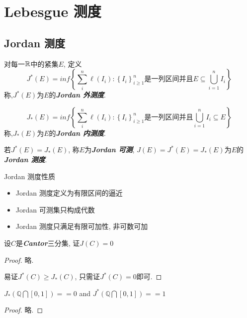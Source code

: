 \documentclass[12pt, a4paper, oneside, UTF8]{ctexbook}  %
\begin{document}
\else
\fi

\chapter{Lebesgue 测度}
\section{Jordan 测度}

\begin{defn}
    对每一$\mathbb{R}$中的紧集$E$, 定义
    \[ J^*(E)=inf\left \{\sum_{i}^{n}\ell(I_i):\left \{ I_i \right \}_{i\ge1}^{n}\mbox{是一列区间并且}E\subseteq\bigcup_{i=1}^{n}I_i\right \} \]
    称,$J^*(E)$为$E$的\textbf{\emph{Jordan 外测度}}.

    \[ J_*(E)=inf\left \{\sum_{i}^{n}\ell(I_i):\left \{ I_i \right \}_{i\ge1}^{n}\mbox{是一列区间并且}\bigcup_{i=1}^{n}I_i\subseteq E\right \} \]
    称,$J_*(E)$为$E$的\textbf{\emph{Jordan 内测度}}.

    若$J^*(E)=J_*(E)$, 称$E$为\textbf{\emph{Jordan 可测}}, $J(E)=J^*(E)=J_*(E)$为$E$的\textbf{\emph{Jordan 测度}}.
\end{defn}

\begin{rmk}
    Jordan 测度性质
    \begin{itemize}
        \item Jordan 测度定义为有限区间的逼近
        \item Jordan 可测集只构成代数
        \item Jordan 测度只满足有限可加性, 非可数可加
    \end{itemize}
\end{rmk}

\begin{example}
    设$C$是\textbf{\emph{Cantor}}三分集, 证$J(C)=0$
    \begin{proof}
        略.
    \par 易证$J^*(C) \geq J_*(C)$, 只需证$J^*(C)=0$即可.
    \end{proof}
\end{example}

\begin{example}
    $J_*(\mathbb{Q}\bigcap[0, 1])==0$ and $J^*(\mathbb{Q}\bigcap[0, 1])==1$
    \begin{proof}
        略.
    \end{proof}
\end{example}
\end{document}
